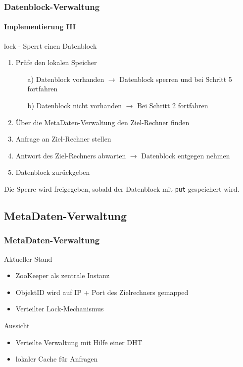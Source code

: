 \documentclass{beamer}
\begin{document}
		\begin{frame}
			\frametitle{Datenblock-Verwaltung}
			\framesubtitle{Implementierung III}

			\begin{block}{lock - Sperrt einen Datenblock}
				\begin{enumerate}
					\item Prüfe den lokalen Speicher
						\begin{enumerate}
							\item[a)] Datenblock vorhanden $\rightarrow$ Datenblock sperren und bei Schritt 5 fortfahren
							\item[b)] Datenblock nicht vorhanden $\rightarrow$ Bei Schritt 2 fortfahren
						\end{enumerate}
					\item Über die MetaDaten-Verwaltung den Ziel-Rechner finden
					\item Anfrage an Ziel-Rechner stellen
					\item Antwort des Ziel-Rechners abwarten $\rightarrow$ Datenblock entgegen nehmen
					\item Datenblock zurückgeben
				\end{enumerate}

				Die Sperre wird freigegeben, sobald der Datenblock mit \texttt{put} gespeichert wird.
			\end{block}
		\end{frame}

	\subsection{MetaDaten-Verwaltung}

		\begin{frame}
			\frametitle{MetaDaten-Verwaltung}

			\begin{block}{Aktueller Stand}
				\begin{itemize}
					\item ZooKeeper als zentrale Instanz
					\item ObjektID wird auf IP + Port des Zielrechners gemapped
					\item Verteilter Lock-Mechanismus
				\end{itemize}
			\end{block}

			\begin{block}{Aussicht}
				\begin{itemize}
					\item Verteilte Verwaltung mit Hilfe einer DHT
					\item lokaler Cache für Anfragen
				\end{itemize}
			\end{block}
		\end{frame}
\end{document}
